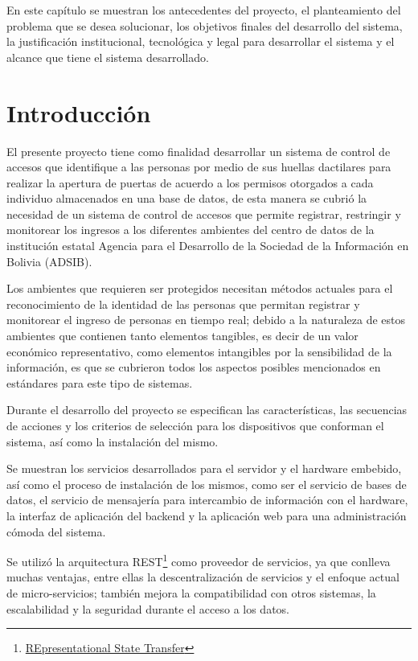 \documentclass[../principal.tex]{subfiles}
\begin{document}
\espacio

  En este capítulo se muestran los antecedentes del proyecto, el planteamiento del problema que se desea solucionar, los objetivos finales del desarrollo del sistema, la justificación institucional, tecnológica y legal para desarrollar el sistema y el alcance que tiene el sistema desarrollado.

  \section{Introducción}

  El presente proyecto tiene como finalidad desarrollar un sistema de control de accesos que identifique a las personas por medio de sus huellas dactilares para realizar la apertura de puertas de acuerdo a los permisos otorgados a cada individuo almacenados en una base de datos, de esta manera se cubrió la necesidad de un sistema de control de accesos que permite registrar, restringir y monitorear los ingresos a los diferentes ambientes del centro de datos de la institución estatal Agencia para el Desarrollo de la Sociedad de la Información en Bolivia (ADSIB).

  Los ambientes que requieren ser protegidos necesitan métodos actuales para el reconocimiento de la identidad de las personas que permitan registrar y monitorear el ingreso de personas en tiempo real; debido a la naturaleza de estos ambientes que contienen tanto elementos tangibles, es decir de un valor económico representativo, como elementos intangibles por la sensibilidad de la información, es que se cubrieron todos los aspectos posibles mencionados en estándares para este tipo de sistemas.

  Durante el desarrollo del proyecto se especifican las características, las secuencias de acciones y los criterios de selección para los dispositivos que conforman el sistema, así como la instalación del mismo.

  Se muestran los servicios desarrollados para el servidor y el hardware embebido, así como el proceso de instalación de los mismos, como ser el servicio de bases de datos, el servicio de mensajería para intercambio de información con el hardware, la interfaz de aplicación del backend y la aplicación web para una administración cómoda del sistema.

  Se utilizó la arquitectura REST\footnote{\href{https://es.wikipedia.org/wiki/Transferencia_de_Estado_Representacional}{REpresentational State Transfer}} como proveedor de servicios, ya que conlleva muchas ventajas, entre ellas la descentralización de servicios y el enfoque actual de micro-servicios; también mejora la compatibilidad con otros sistemas, la escalabilidad y la seguridad durante el acceso a los datos.
\end{document}
